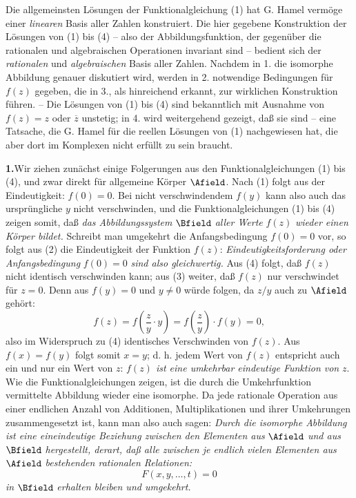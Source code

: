 Die allgemeinsten Lösungen der Funktionalgleichung (1) hat G. Hamel vermöge einer \emph{linearen} Basis aller Zahlen konstruiert. Die hier gegebene Konstruktion der Lösungen von (1) bis (4) -- also der Abbildungsfunktion, der gegenüber die rationalen und algebraischen Operationen invariant sind -- bedient sich der \emph{rationalen} und \emph{algebraischen} Basis aller Zahlen. Nachdem in 1. die isomorphe Abbildung genauer diskutiert wird, werden in 2. notwendige Bedingungen für \(f(z)\) gegeben, die in 3., als hinreichend erkannt, zur wirklichen Konstruktion führen. -- Die Lösungen von (1) bis (4) sind bekanntlich mit Ausnahme von \(f(z)=z\) oder \(\overline z\) unstetig; in 4. wird weitergehend gezeigt, daß sie  sind -- eine Tatsache, die G. Hamel für die reellen Lösungen von (1) nachgewiesen hat, die aber dort im Komplexen nicht erfüllt zu sein braucht.

\medskip
\noindent\textbf{1.}\quad Wir ziehen zunächst einige Folgerungen aus den Funktionalgleichungen (1) bis (4), und zwar direkt für allgemeine Körper \(\Afield\). Nach (1) folgt aus der Eindeutigkeit: \(f(0)=0\). Bei nicht verschwindendem \(f(y)\) kann also auch das ursprüngliche \(y\) nicht verschwinden, und die Funktionalgleichungen (1) bis (4) zeigen somit, daß \emph{das Abbildungssystem} \(\Bfield\) \emph{aller Werte} \(f(z)\) \emph{wieder einen Körper bildet.} Schreibt man umgekehrt die Anfangsbedingung \(f(0)=0\) vor, so folgt aus (2) die Eindeutigkeit der Funktion \(f(z)\): \emph{Eindeutigkeitsforderung oder Anfangsbedingung} \(f(0)=0\) \emph{sind also gleichwertig.} Aus (4) folgt, daß \(f(z)\) nicht identisch verschwinden kann; aus (3) weiter, daß \(f(z)\) nur verschwindet für \(z=0\). Denn aus \(f(y)=0\) und \(y\ne0\) würde folgen, da \(z/y\) auch zu \(\Afield\) gehört:
\[
f(z)=f\!\left(\frac{z}{y}\cdot y\right)=f\!\left(\frac{z}{y}\right)\cdot f(y)=0,
\]
also im Widerspruch zu (4) identisches Verschwinden von \(f(z)\). Aus \(f(x)=f(y)\) folgt somit \(x=y\); d. h. jedem Wert von \(f(z)\) entspricht auch ein und nur ein Wert von \(z\): \emph{\(f(z)\) ist eine umkehrbar eindeutige Funktion von} \(z\). Wie die Funktionalgleichungen zeigen, ist die durch die Umkehrfunktion vermittelte Abbildung wieder eine isomorphe. Da jede rationale Operation aus einer endlichen Anzahl von Additionen, Multiplikationen und ihrer Umkehrungen zusammengesetzt ist, kann man also auch sagen: \emph{Durch die isomorphe Abbildung ist eine eineindeutige Beziehung zwischen den Elementen aus} \(\Afield\) \emph{und aus} \(\Bfield\) \emph{hergestellt, derart, daß alle zwischen je endlich vielen Elementen aus} \(\Afield\) \emph{bestehenden rationalen Relationen:}
\[
F(x,y,\ldots,t)=0
\]
\emph{in} \(\Bfield\) \emph{erhalten bleiben und umgekehrt.}

